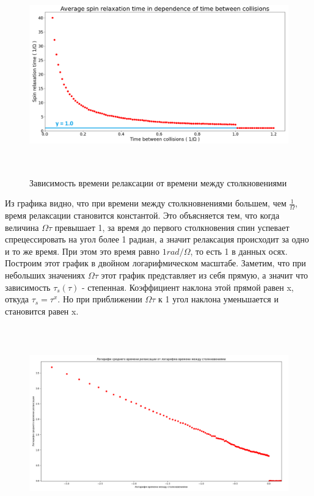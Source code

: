 \documentclass[12pt,oneside]{book}
\begin{document}
{{	\begin{figure}[h!]
		\centering
		\includegraphics[width = 16cm, height = 8.65cm]{img/T_5000_117_from0,04to1,2.png}
		\caption{Зависимость времени релаксации от времени между столкновениями}
		\label{fig:f3}
	\end{figure} 
	Из графика видно, что при времени между столкновнениями большем, чем $\frac{1}{\Omega}$, время релаксации становится константой. Это объясняется тем, что когда величина ${\Omega}{\tau}$ превышает 1, за время до первого столкновения спин успевает спрецессировать на угол более 1 радиан, а значит релаксация происходит за одно и то же время. При этом это время равно  ${1 rad/\Omega}$, то есть 1 в данных осях.
	\newline
	Построим этот график в двойном логарифмическом масштабе. Заметим, что при небольших значениях  ${\Omega}{\tau}$ этот график представляет из себя прямую, а значит что зависимость  $\tau_s(\tau)$ - степенная. Коэффициент наклона этой прямой равен x, откуда  $\tau_s = \tau^x$. Но при приближении ${\Omega}{\tau}$ к 1 угол наклона уменьшается и становится равен x.
	\begin{figure}[h!]
		\centering
		\includegraphics[width = 16cm, height = 8.41cm]{img/Log_from0,04to1,2_5000.png}

\end{figure}}}
\end{document}
